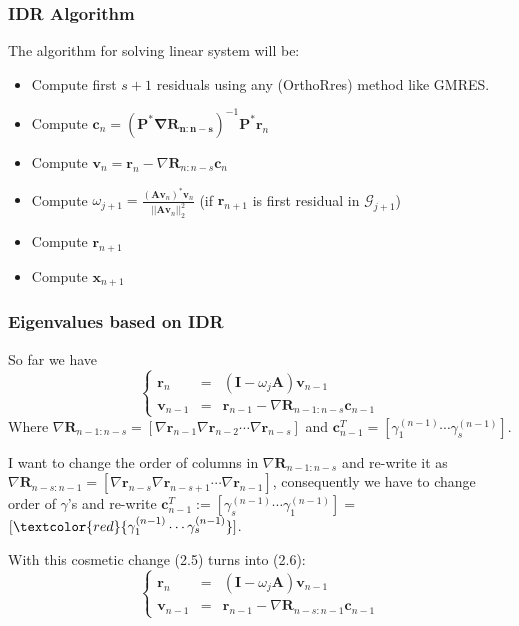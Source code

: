 \documentclass[mathserif]{beamer}
\begin{document}
\begin{frame}
\frametitle{IDR Algorithm}
The algorithm for solving linear system will be:\\
\vspace{.1in}
\begin{itemize}[<+->]
\item Compute first $s+1$ residuals using any (OrthoRres) method like GMRES.
\item Compute $\mathbf{c}_n=(\mathbf{P^*\nabla \mathbf{R}_{n:n-s}})^{-1}\mathbf{P^*}\mathbf{r}_n$
\item Compute $\mathbf{v}_n=\mathbf{r}_n-\nabla \mathbf{R}_{n:n-s}\mathbf{c}_n$
\item Compute $\omega_{j+1}=\frac{(\mathbf{A}\mathbf{v}_n)^*\mathbf{v}_n}{||\mathbf{A}\mathbf{v}_n||_2^2}$ (if $\mathbf{r}_{n+1}$ is first residual in $\mathcal{G}_{j+1}$)
\item Compute $\mathbf{r}_{n+1}$
\item Compute $\mathbf{x}_{n+1}$

\end{itemize}
\end{frame}


\begin{frame}
\frametitle{Eigenvalues based on IDR}
So far we have \[\left\{ \tag{2.5}\begin{array}{llll} \mathbf{r}_n &=& (\mathbf{I}-\omega_j \mathbf{A}) \mathbf{v}_{n-1}\\ \mathbf{v}_{n-1}&=&\mathbf{r}_{n-1}-\nabla \mathbf{R}_{n-1:n-s}\mathbf{c}_{n-1}\end{array}\right.\] Where $\nabla \mathbf{R}_{n-1:n-s}=[\nabla \mathbf{r}_{n-1}  \nabla \mathbf{r}_{n-2} \cdots \nabla \mathbf{r}_{n-s}]$ and $\mathbf{c}_{n-1}^T=[\gamma_1^{(n-1)} \cdots \gamma_s^{(n-1)}]$. 

\pause
\vspace{.1in}
I want to change the order of columns in $\nabla \mathbf{R}_{n-1:n-s}$ and re-write it as $\nabla \mathbf{R}_{n-s:n-1}=[\nabla \mathbf{r}_{n-s} \nabla \mathbf{r}_{n-s+1} \cdots \nabla \mathbf{r}_{n-1}]$, consequently we have to change order of $\gamma$'s and re-write $\mathbf{c}_{n-1}^T:=[\gamma_s^{(n-1)} \cdots \gamma_1^{(n-1)}]=$\pause$ [\textcolor{red}{\gamma_1^{(n-1)} \cdots \gamma_s^{(n-1)}}]$.

\pause
\vspace{.1in}
With this cosmetic change (2.5) turns into (2.6):\\

 \[\left\{ \tag{2.6}\begin{array}{llll} \mathbf{r}_{n} &=& (\mathbf{I}-\omega_{j} \mathbf{A}) \mathbf{v}_{n-1}\\ \mathbf{v}_{n-1}&=&\mathbf{r}_{n-1}-\nabla \mathbf{R}_{n-s:n-1}\mathbf{c}_{n-1}\end{array}\right.\]
\end{frame}
\end{document}
